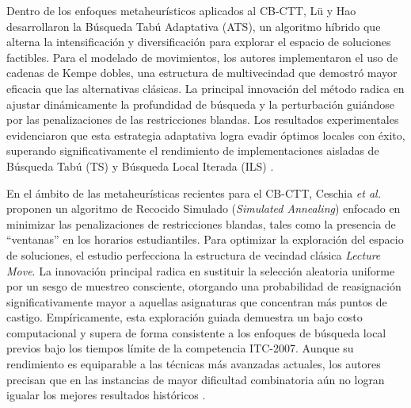 \documentclass[letter, 10pt]{article}
\begin{document}
Dentro de los enfoques metaheurísticos aplicados al CB-CTT, Lü y Hao \cite{lu2010} desarrollaron la Búsqueda Tabú Adaptativa (ATS), un algoritmo híbrido que alterna la intensificación y diversificación para explorar el espacio de soluciones factibles. Para el modelado de movimientos, los autores implementaron el uso de cadenas de Kempe dobles, una estructura de multivecindad que demostró mayor eficacia que las alternativas clásicas. La principal innovación del método radica en ajustar dinámicamente la profundidad de búsqueda y la perturbación guiándose por las penalizaciones de las restricciones blandas. Los resultados experimentales evidenciaron que esta estrategia adaptativa logra evadir óptimos locales con éxito, superando significativamente el rendimiento de implementaciones aisladas de Búsqueda Tabú (TS) y Búsqueda Local Iterada (ILS) \cite{lu2010}.

En el ámbito de las metaheurísticas recientes para el CB-CTT, Ceschia \textit{et al.} \cite{ceschia2012} proponen un algoritmo de Recocido Simulado (\textit{Simulated Annealing}) enfocado en minimizar las penalizaciones de restricciones blandas, tales como la presencia de ``ventanas'' en los horarios estudiantiles. Para optimizar la exploración del espacio de soluciones, el estudio perfecciona la estructura de vecindad clásica \textit{Lecture Move}. La innovación principal radica en sustituir la selección aleatoria uniforme por un sesgo de muestreo consciente, otorgando una probabilidad de reasignación significativamente mayor a aquellas asignaturas que concentran más puntos de castigo. Empíricamente, esta exploración guiada demuestra un bajo costo computacional y supera de forma consistente a los enfoques de búsqueda local previos bajo los tiempos límite de la competencia ITC-2007. Aunque su rendimiento es equiparable a las técnicas más avanzadas actuales, los autores precisan que en las instancias de mayor dificultad combinatoria aún no logran igualar los mejores resultados históricos \cite{ceschia2012}.
\end{document}
